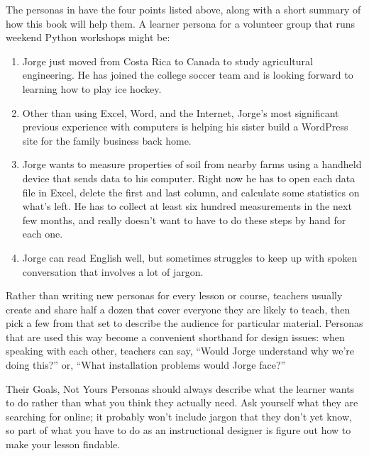 The personas in  have the four points listed above,
along with a short summary of how this book will help them.
A learner persona for a volunteer group that runs weekend Python workshops might be:

\begin{enumerate}

\item
  Jorge just moved from Costa Rica to Canada to study agricultural engineering.
  He has joined the college soccer team
  and is looking forward to learning how to play ice hockey.

\item
  Other than using Excel, Word, and the Internet,
  Jorge's most significant previous experience with computers
  is helping his sister build a WordPress site
  for the family business back home.

\item
  Jorge wants to measure properties of soil from nearby farms
  using a handheld device that sends data to his computer.
  Right now he has to open each data file in Excel,
  delete the first and last column,
  and calculate some statistics on what's left.
  He has to collect at least six hundred measurements in the next few months,
  and really doesn't want to have to do these steps by hand for each one.

\item
  Jorge can read English well,
  but sometimes struggles to keep up with spoken conversation that involves a lot of jargon.

\end{enumerate}

Rather than writing new personas for every lesson or course,
teachers usually create and share half a dozen
that cover everyone they are likely to teach,
then pick a few from that set to describe the audience for particular material.
Personas that are used this way become a convenient shorthand for design issues:
when speaking with each other,
teachers can say,
``Would Jorge understand why we're doing this?''
or,
``What installation problems would Jorge face?''

\begin{aside}{Their Goals, Not Yours}
  Personas should always describe what the learner wants to do
  rather than what you think they actually need.
  Ask yourself what they are searching for online;
  it probably won't include jargon that they don't yet know,
  so part of what you have to do as an instructional designer is
  figure out how to make your lesson findable.
\end{aside}


